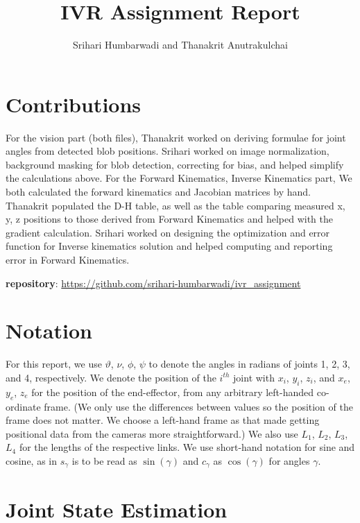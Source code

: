 \documentclass[11pt, a4paper]{article}
\title{IVR Assignment Report}
\author{Srihari Humbarwadi and Thanakrit Anutrakulchai}
\begin{document}
    \maketitle
    \section{Contributions}
    For the vision part (both files), Thanakrit worked on deriving formulae for joint angles from detected blob positions. Srihari worked on image normalization, background masking for blob detection, correcting for bias, and helped simplify the calculations above.
    For the Forward Kinematics, Inverse Kinematics part, We both calculated the forward kinematics and Jacobian matrices by hand. Thanakrit populated the D-H table, as well as the table comparing measured x, y, z positions to those derived from Forward Kinematics and helped with the gradient calculation. Srihari worked on designing the optimization and error function for Inverse kinematics solution and helped computing and reporting error in Forward Kinematics. 

\noindent \textbf{repository}: \url{https://github.com/srihari-humbarwadi/ivr_assignment}
    

    \section{Notation}
    For this report, we use
    $\vartheta$, $\nu$, $\phi$, $\psi$ to denote the angles in radians of joints 1, 2, 3, and 4, respectively. 
    We denote the position of the $i^{th}$ joint with
    $x_i$, $y_i$, $z_i$, and $x_e$, $y_e$, $z_e$ for the position of the end-effector,
    from any arbitrary left-handed co-ordinate frame.
    (We only use the differences between values so the position of the frame
    does not matter. We choose a left-hand frame as that made getting positional data
    from the cameras more straightforward.)
    We also use $L_1$, $L_2$, $L_3$, $L_4$ for the
    lengths of the respective links. 
    We use short-hand notation for sine and cosine,
    as in $s_{\gamma}$ is to be read as $\sin(\gamma)$ and $c_{\gamma}$
    as $\cos(\gamma)$ for angles $\gamma$.
    



    \section{Joint State Estimation}
\end{document}
